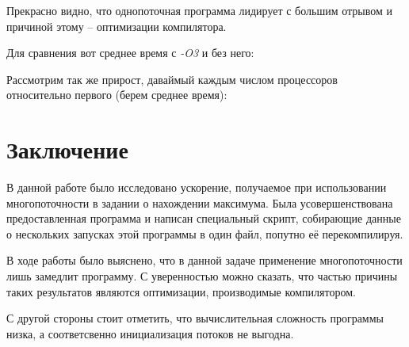 \documentclass[a4paper, 12pt]{article}
\begin{document}
\vspace{0.3cm}

Прекрасно видно, что однопоточная программа лидирует с большим отрывом и причиной этому -- оптимизации компилятора.

Для сравнения вот среднее время с \textit{-O3} и без него:

\vspace{0.3cm}


\vspace{0.3cm}

Рассмотрим так же прирост, даваймый каждым числом процессоров относительно первого (берем среднее время):



\section{Заключение}
В данной работе было исследовано ускорение, получаемое при использовании многопоточности в задании о нахождении максимума. Была усовершенствована предоставленная программа и написан специальный скрипт, собирающие данные о нескольких запусках этой программы в один файл, попутно её перекомпилируя.

В ходе работы было выяснено, что в данной задаче применение многопоточности лишь замедлит программу. С уверенностью можно сказать, что частью причины таких результатов являются оптимизации, производимые компилятором.

С другой стороны стоит отметить, что вычислительная сложность программы низка, а соответсвенно инициализация потоков не выгодна.
\end{document}
